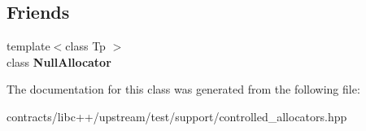\subsection*{Friends}
\begin{DoxyCompactItemize}
\item 
\mbox{\label{class_null_allocator_aefa413122004dbeac561e5f70996dc43}} 
{\footnotesize template$<$class Tp $>$ }\\class {\bfseries Null\+Allocator}
\end{DoxyCompactItemize}


The documentation for this class was generated from the following file\+:\begin{DoxyCompactItemize}
\item 
contracts/libc++/upstream/test/support/controlled\+\_\+allocators.\+hpp\end{DoxyCompactItemize}
